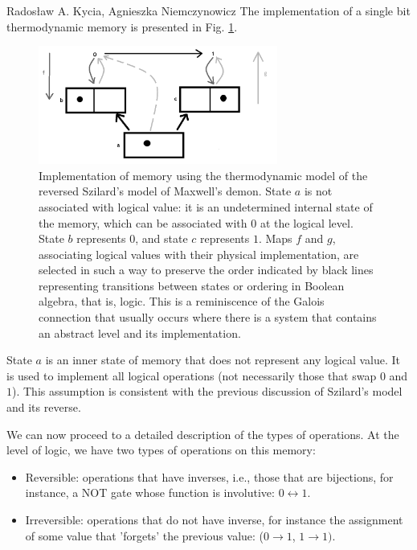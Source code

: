 \begin{artengenv2auth}{Rados\l aw A. Kycia, Agnieszka Niemczynowicz}
The implementation of a single bit thermodynamic memory is presented in Fig. \ref{Fig.BinaryCell}.
\begin{figure}
\centering
 \includegraphics[width=0.7\textwidth]{ART_Kycia_Niemczynowicz/BinaryGalois-bw.png}
 \caption{Implementation of memory using the thermodynamic model of the reversed Szilard's model of Maxwell's demon. State $a$ is not associated with logical value: it is an undetermined internal state of the memory, which can be associated with $0$ at the logical level. State $b$ represents $0$, and state $c$ represents $1$. Maps $f$ and $g$, associating logical values with their physical implementation, are selected in such a way to preserve the order indicated by black lines representing transitions between states or ordering in Boolean algebra, that is, logic. This is a reminiscence of the Galois connection \parencite{SpivakSketches, CategoryGentleIntroduction, KyciaLandauer} that usually occurs where there is a system that contains an abstract level and its implementation.}
 \label{Fig.BinaryCell}
\end{figure}

State $a$ is an inner state of memory that does not represent any logical value. It is used to implement all logical operations (not necessarily those that swap $0$ and $1$). This assumption is consistent with the previous discussion of Szilard's model and its reverse. 

We can now proceed to a detailed description of the types of operations. At the level of logic, we have two types of operations on this memory:
\begin{itemize}
 \item {Reversible: operations that have inverses, i.e., those that are bijections, for instance, a NOT gate whose function is involutive: $0  \leftrightarrow 1$.}
 \item {Irreversible: operations that do not have inverse, for instance the assignment of some value that 'forgets' the previous value: ($0 \rightarrow 1$, $1 \rightarrow 1)$.}
\end{itemize}


\end{artengenv2auth}
